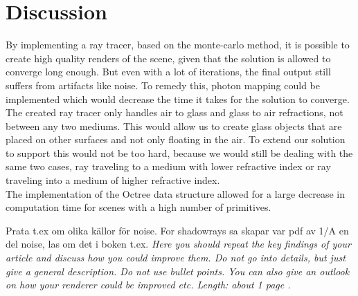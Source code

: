 \documentclass[a4paper, 12pt]{report}
\begin{document}
\chapter{Discussion} \label{ch:discussion}
By implementing a ray tracer, based on the monte-carlo method, it is possible to create high quality renders of the scene, given that the solution is allowed to converge long enough.
But even with a lot of iterations, the final output still suffers from artifacts like noise.
To remedy this, photon mapping could be implemented which would decrease the time it takes for the solution to converge.\\

The created ray tracer only handles air to glass and glass to air refractions, not between any two mediums.
This would allow us to create glass objects that are placed on other surfaces and not only floating in the air.
To extend our solution to support this would not be too hard, because we would still be dealing with the same two cases, ray traveling to a medium with lower refractive index or ray traveling into a medium of higher refractive index.
\\

The implementation of the Octree data structure allowed for a large decrease in computation time for scenes with a high number of primitives.



Prata t.ex om olika källor för noise. For shadowrays sa skapar var pdf av 1/A en del noise, las om det i boken t.ex.
\emph{Here you should repeat the key findings of your article and discuss how you could improve them. 
Do not go into details, but just give a general description. 
Do not use bullet points. 
You can also give an outlook on how your renderer could be improved etc. 
Length: about 1 page .}



\end{document}
